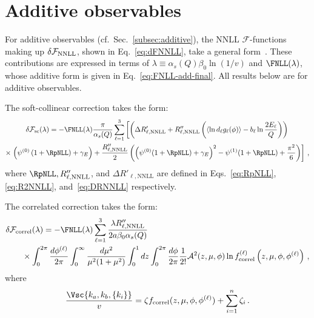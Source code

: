 \chapter{Additive observables}
\label{ap:add-res-NNLL}

For additive observables (cf.\ Sec.~\ref{subsec:additive}), the NNLL $\mathcal{F}$-functions
making up $\delta\mathcal{F}_{\rm NNLL}$, shown in Eq.~\eqref{eq:dFNNLL}, take a general
form~\cite{Arpino:2019ozn}. These contributions are expressed in terms of
$\lambda \equiv \alpha_s(Q)\beta_0\ln(1/v)$ and $\FNLL(\lambda)$, whose additive form is given
in Eq.~\eqref{eq:FNLL-add-final}. All results below are for additive observables.
 
The soft-collinear correction takes the form:
\begin{multline}
 \label{eq:dFsc-general-add}
\delta\mathcal{F}_{\mathrm{sc}}(\lambda)=-\FNLL(\lambda)\frac{\pi}{\alpha_s(Q)}\sum_{\ell=1}^3\left[\left(\Delta R'_{\ell,\mathrm{NNLL}}+ R''_{\ell,\mathrm{NNLL}}\left(\langle \ln d_\ell g_\ell(\phi)\rangle-b_\ell\ln\frac{2E_\ell}{Q}\right)\right)\right. \\
\times \left.\left(\psi^{(0)}\left(1+\RpNLL\right)+\gamma_E\right)+\frac{R''_{\ell,\mathrm{NNLL}}}{2}\left(\left(\psi^{(0)}(1+\RpNLL)+\gamma_E\right)^2-\psi^{(1)}(1+\RpNLL)+\frac{\pi^2}{6}\right)\right]\,,
\end{multline}
where $\RpNLL, R''_{\ell,\mathrm{NNLL}}$, and $\Delta R'_{\ell,\mathrm{NNLL}}$
are defined in Eqs.~\eqref{eq:RpNLL}, \eqref{eq:R2NNLL}, and~\eqref{eq:DRNNLL} respectively. 

The correlated correction takes the form:
\begin{equation}
\begin{aligned}
\label{eq:dFcorrel-general-add}
&\delta\mathcal{F}_{\mathrm{correl}}(\lambda)=-\FNLL(\lambda)
\sum_{\ell=1}^3\frac{\lambda R''_{\ell,\mathrm{NNLL}}}{2a\beta_0\alpha_s(Q)}\\
&\qquad\times
\int_0^{2\pi}\frac{d\phi^{(\ell)}}{2\pi}\int_0^\infty
\frac{d\mu^2}{\mu^2(1+\mu^2)}\int_0^1dz\int_0^{2\pi}\frac{d\phi}{2\pi}\frac{1}{2!}\mathcal{A}^2(z,\mu,\phi)
\ln f^{(\ell)}_{\mathrm{correl}}\left(z,\mu,\phi,\phi^{(\ell)}\right)\,,
\end{aligned}
\end{equation}
where
\begin{equation}
	\frac{\Vsc{k_a,k_b,\{k_i\}}}{v}=\zeta f_{\rm correl}(z,\mu,\phi,\phi^{(\ell)})+\sum_{i=1}^n\zeta_i\,.
\end{equation}

